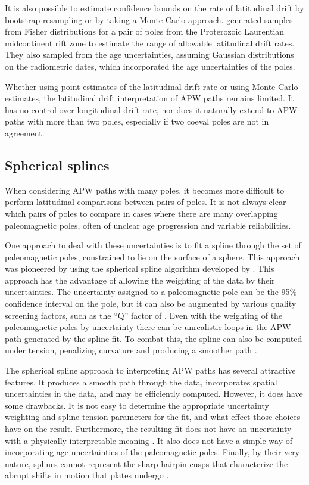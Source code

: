 \documentclass[preprint,12pt,authoryear]{elsarticle}
\begin{document}
It is also possible to estimate confidence bounds on the rate of latitudinal drift by
bootstrap resampling \citep[e.g.][]{tarduno1990fast} or by taking a Monte Carlo approach. 
\citet{swanson2014confirmation} generated samples from Fisher distributions
for a pair of poles from the Proterozoic Laurentian midcontinent rift zone to estimate the range
of allowable latitudinal drift rates. They also sampled from the age uncertainties, assuming
Gaussian distributions on the radiometric dates, which incorporated the age uncertainties of the poles.

Whether using point estimates of the latitudinal drift rate or using Monte Carlo estimates, 
the latitudinal drift interpretation of APW paths remains limited.
It has no control over longitudinal drift rate, 
nor does it naturally extend to APW paths with more than two poles, 
especially if two coeval poles are not in agreement.

\subsection{Spherical splines}

When considering APW paths with many poles, it becomes more difficult to perform
latitudinal comparisons between pairs of poles. It is not always clear which pairs of
poles to compare in cases where there are many overlapping paleomagnetic poles,
often of unclear age progression and variable reliabilities.

One approach to deal with these uncertainties is to fit a spline through the
set of paleomagnetic poles, constrained to lie on the surface of a sphere.
This approach was pioneered by \citet{torsvik1992baltica} using the spherical spline
algorithm developed by \citet{jupp1987fitting}.
This approach has the advantage of allowing the weighting of the data by their
uncertainties. The uncertainty assigned to a paleomagnetic pole can
be the 95\% confidence interval on the pole, but it can also be augmented
by various quality screening factors, such as the ``Q'' factor of \citet{van1990reliability} \citep{torsvik1992baltica}. 
Even with the weighting of the paleomagnetic poles by uncertainty there
can be unrealistic loops in the APW path generated by the spline fit.
To combat this, the spline can also be computed under tension, penalizing
curvature and producing a smoother path \citep{torsvik1996continental}.

The spherical spline approach to interpreting APW paths has several attractive features.
It produces a smooth path through the data, incorporates spatial uncertainties
in the data, and may be efficiently computed.
However, it does have some drawbacks.
It is not easy to determine the appropriate uncertainty weighting and spline
tension parameters for the fit, and what effect those choices have on the result.
Furthermore, the resulting fit does not have an uncertainty with a physically
interpretable meaning \citep{torsvik1996continental}.
It also does not have a simple way of incorporating age uncertainties of the paleomagnetic poles.
Finally, by their very nature, splines cannot represent the sharp hairpin cusps
that characterize the abrupt shifts in motion that plates undergo \citep{irving1972hairpins, gordon1984paleomagnetic}.
\end{document}
